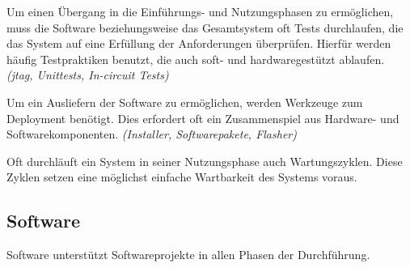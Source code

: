Um einen Übergang in die Einführungs- und Nutzungsphasen zu ermöglichen, muss
die Software beziehungsweise das Gesamtsystem oft Tests durchlaufen, die das
System auf eine Erfüllung der Anforderungen überprüfen. Hierfür werden
häufig Testpraktiken benutzt, die auch soft- und hardwaregestützt
ablaufen. \emph{(\gls{jtag}, Unittests, In-circuit Tests)}

Um ein Ausliefern der Software zu ermöglichen, werden Werkzeuge zum Deployment
benötigt. Dies erfordert oft ein Zusammenspiel aus Hardware-
und Softwarekomponenten. \emph{(Installer, Softwarepakete, Flasher)}

Oft durchläuft ein System in seiner Nutzungsphase auch Wartungszyklen.
Diese Zyklen setzen eine möglichst einfache Wartbarkeit des Systems voraus.

\subsection{Software}\label{sub:software}
Software unterstützt Softwareprojekte in allen Phasen der Durchführung.

